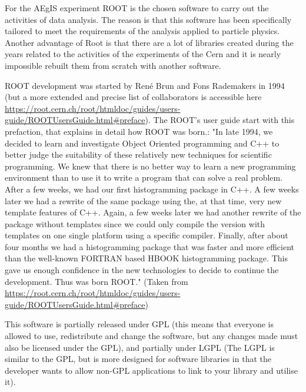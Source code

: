For the AEgIS experiment ROOT is the chosen software to carry out the activities of data analysis. The reason is that this software has been specifically tailored to meet the requirements of the analysis applied to particle physics.
Another advantage of Root is that there are a lot of libraries created during the years related to the activities of the experiments of the Cern and it is nearly impossible rebuilt them from scratch with another software.

ROOT development was started by René Brun and Fons Rademakers in 1994 (but a more extended and precise list of collaborators is accessible here \url{https://root.cern.ch/root/htmldoc/guides/users-guide/ROOTUsersGuide.html#preface}). 
The ROOT's user guide start with this prefaction, that explains in detail how ROOT was born.:
"In late 1994, we decided to learn and investigate Object Oriented programming and C++ to better judge the suitability of these relatively new techniques for scientific programming. We knew that there is no better way to learn a new programming environment than to use it to write a program that can solve a real problem. After a few weeks, we had our first histogramming package in C++. A few weeks later we had a rewrite of the same package using the, at that time, very new template features of C++. Again, a few weeks later we had another rewrite of the package without templates since we could only compile the version with templates on one single platform using a specific compiler. Finally, after about four months we had a histogramming package that was faster and more efficient than the well-known FORTRAN based HBOOK histogramming package. This gave us enough confidence in the new technologies to decide to continue the development. Thus was born ROOT."
(Taken from \url{https://root.cern.ch/root/htmldoc/guides/users-guide/ROOTUsersGuide.html#preface})


This software is partially released under GPL (this means that everyone is allowed to use, redistribute and change the software, but any changes made must also be licensed under the GPL), and partially under LGPL (The LGPL is similar to the GPL, but is more designed for software libraries in that the developer wants to allow non-GPL applications to link to your library and utilise it).

